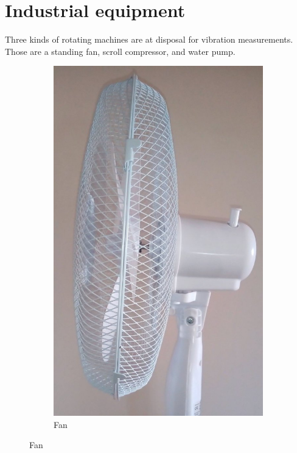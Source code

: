\section{Industrial equipment}
Three kinds of rotating machines are at disposal for vibration measurements. Those are a standing fan, scroll compressor, and water pump.

\begin{figure}[ht]
    \centering
    \begin{subfigure}[b]{0.17\textwidth}
    		\centering
        \includegraphics[width=\textwidth]{assets/design/machine-fan.jpg}
        \caption{\footnotesize Fan}

\end{subfigure}
\end{figure}
